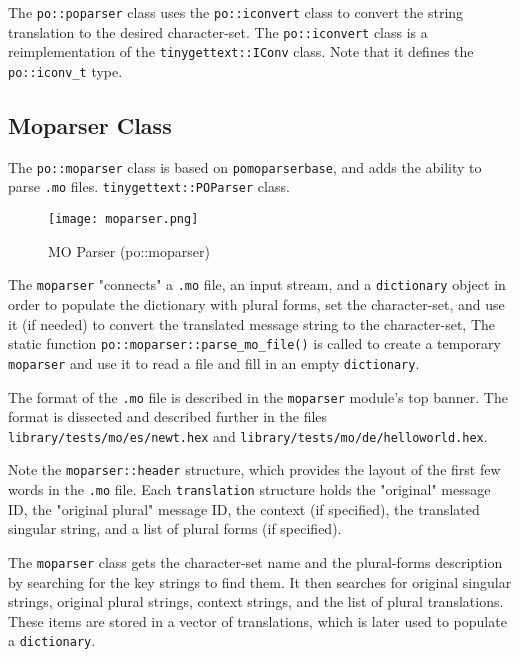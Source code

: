    The \texttt{po::poparser} class uses the \texttt{po::iconvert} class
   to convert the string translation to the desired character-set.
   The \texttt{po::iconvert} class is a reimplementation of the
   \texttt{tinygettext::IConv} class.
   Note that it defines the \texttt{po::iconv\_t} type.

\subsection{Moparser Class}
\label{subsec:potext_moparser_class}

   The \texttt{po::moparser} class is based on \texttt{pomoparserbase},
   and adds the ability to parse \texttt{.mo} files.
   \texttt{tinygettext::POParser} class.

\begin{figure}[H]
   \centering 
   \texttt{[image: moparser.png]}
   \caption{MO Parser (po::moparser)}
   \label{fig:potext_moparser}
\end{figure}

   The \texttt{moparser} "connects" a \texttt{.mo} file, an input stream,
   and a \texttt{dictionary} object in order to populate the dictionary with
   plural forms, set the character-set, and use it (if needed) to convert the
   translated message string to the character-set,
   The static function \texttt{po::moparser::parse\_mo\_file()} is called to
   create a temporary \texttt{moparser} and use it to
   read a file and fill in an empty \texttt{dictionary}.

   The format of the \texttt{.mo} file is described in the \texttt{moparser}
   module's top banner. The format is dissected and described further in the
   files
   \texttt{library/tests/mo/es/newt.hex} and
   \texttt{library/tests/mo/de/helloworld.hex}.

   Note the \texttt{moparser::header} structure, which provides
   the layout of the first few words in the \texttt{.mo} file.
   Each \texttt{translation} structure holds the "original" message ID,
   the "original plural" message ID, the context (if specified),
   the translated singular string, and a list of plural forms (if specified).

   The \texttt{moparser} class gets the character-set name and the
   plural-forms description by searching for the key strings to find them.
   It then searches for original singular strings, original
   plural strings, context strings, and the list of plural translations.
   These items are stored in a vector of translations, which is later
   used to populate a \texttt{dictionary}.

